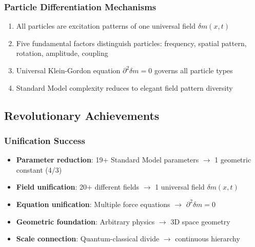 \documentclass[12pt,a4paper]{article}
\newcommand{\deltafield}{\ensuremath{\delta m}}
\newcommand{\myrightarrow}{\ensuremath{\rightarrow}}
\begin{document}
	\subsubsection{Particle Differentiation Mechanisms}
	\label{subsubsec:particle_differentiation_summary}
	
	\begin{enumerate}
		\item All particles are excitation patterns of one universal field $\deltafield(x,t)$
		\item Five fundamental factors distinguish particles: frequency, spatial pattern, rotation, amplitude, coupling
		\item Universal Klein-Gordon equation $\partial^2\deltafield = 0$ governs all particle types
		\item Standard Model complexity reduces to elegant field pattern diversity
	\end{enumerate}
	
	\subsection{Revolutionary Achievements}
	\label{subsec:revolutionary_achievements}
	
	\subsubsection{Unification Success}
	\label{subsubsec:unification_success}
	
	\begin{tcolorbox}[colback=yellow!10!white,colframe=orange!75!black,title=T0 Theory Revolutionary Achievements]
		\begin{itemize}
			\item \textbf{Parameter reduction}: 19+ Standard Model parameters $\myrightarrow$ 1 geometric constant (4/3)
			\item \textbf{Field unification}: 20+ different fields $\myrightarrow$ 1 universal field $\deltafield(x,t)$
			\item \textbf{Equation unification}: Multiple force equations $\myrightarrow$ $\partial^2\deltafield = 0$
			\item \textbf{Geometric foundation}: Arbitrary physics $\myrightarrow$ 3D space geometry
			\item \textbf{Scale connection}: Quantum-classical divide $\myrightarrow$ continuous hierarchy
		\end{itemize}
	\end{tcolorbox}
	
\end{document}
